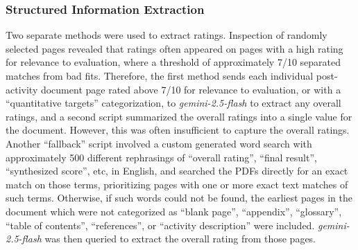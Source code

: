 \subsubsection{Structured Information Extraction}
Two separate methods were used to extract ratings. Inspection of randomly selected pages revealed that ratings often appeared on pages with a high rating for relevance to evaluation, where a threshold of approximately 7/10 separated matches from bad fits. Therefore, the first method sends each individual post-activity document page rated above 7/10 for relevance to evaluation, or with a ``quantitative targets'' categorization, to \emph{gemini-2.5-flash} to extract any overall ratings, and a second script summarized the overall ratings into a single value for the document. However, this was often insufficient to capture the overall ratings. Another ``fallback'' script involved a custom generated word search with approximately 500 different rephrasings of ``overall rating'', ``final result'', ``synthesized score'', etc, in English, and searched the PDFs directly for an exact match on those terms, prioritizing pages with one or more exact text matches of such terms. Otherwise, if such words could not be found, the earliest pages in the document which were not categorized as ``blank page'', ``appendix'', ``glossary'', ``table of contents'', ``references'', or ``activity description'' were included. \emph{gemini-2.5-flash} was then queried to extract the overall rating from those pages.


